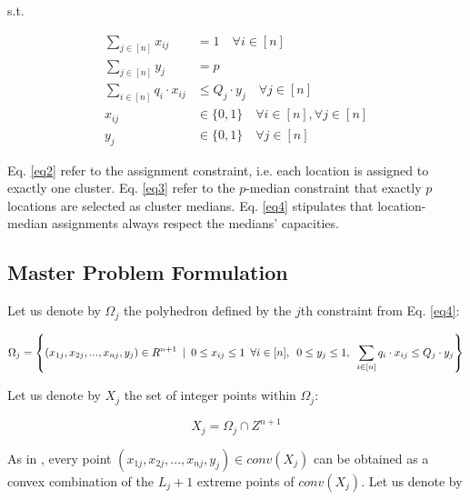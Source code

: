 \documentclass[
	11pt,
	DIV10,
	ngerman,
	a4paper,
	oneside,
	headings=normal,
	captions=tableheading,
	final,
	numbers=noenddot
]{scrartcl}
\begin{document}
s.t.

\begin{align}
	\label{eq2}	\sum_{j \in [n]} x_{ij} &= 1 \quad \forall i \in [n] \\[1em]
	\label{eq3} \sum_{j \in [n]} y_{j} &= p \\[1em]
	\label{eq4} \sum_{i \in [n]} q_{i} \cdot x_{ij} &\leq Q_{j} \cdot y_{j} \quad \forall j \in [n] \\[1em]
	x_{ij} &\in \{0, 1\} \quad \forall i \in [n], \forall j \in [n] \nonumber \\[1em]
	y_{j} &\in \{0, 1\} \quad \forall j \in [n] \nonumber
\end{align}

Eq. \eqref{eq2} refer to the assignment constraint, i.e. each location is assigned to exactly one cluster. Eq. \eqref{eq3} refer to the $ p $-median constraint that exactly $ p $ locations are selected as cluster medians. Eq. \eqref{eq4} stipulates that location-median assignments always respect the medians' capacities.

\subsection{Master Problem Formulation}

Let us denote by $ \Omega_{j} $ the polyhedron defined by the $ j $th constraint from Eq. \eqref{eq4}:

\small

\begin{equation}
	\Omega_{j} = \left\{(x_{1j}, x_{2j}, ..., x_{nj}, y_{j}) \in R^{n + 1} \hspace{0.5em} | \hspace{0.5em} 0 \leq x_{ij} \leq 1 \hspace{0.5em} \forall i \in [n], \hspace{0.5em} 0 \leq y_{j} \leq 1, \hspace{0.5em} \sum_{i \in [n]} q_{i} \cdot x_{ij} \leq Q_{j} \cdot y_{j}\right\} \nonumber
\end{equation}

\normalsize

Let us denote by $ X_{j} $ the set of integer points within $ \Omega_{j} $:

\begin{equation}
	X_{j} = \Omega_{j} \cap Z^{n + 1} \nonumber
\end{equation}

As in \cite{ceselli2005branch}, every point $ (x_{1j}, x_{2j}, ..., x_{nj}, y_{j}) \in conv(X_{j}) $ can be obtained as a convex combination of the $ L_{j} + 1 $ extreme points of $ conv(X_{j}) $. Let us denote by
\end{document}
